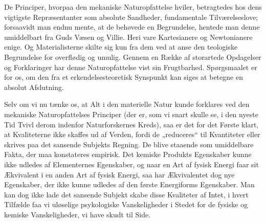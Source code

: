 \documentclass[12pt,a4paper,openany]{book}
\newcommand{\opage}[1]{\marginnote{\footnotesize\textit{[#1]}}}
\begin{document}
De Principer, hvorpaa den mekaniske Naturopfattelse hviler, betragtedes hos
dens vigtigste Repræsentanter som absolute Sandheder, fundamentale
Tilværelseslove; forsaavidt man endnu mente, at de behøvede en Begrundelse,
hentede man denne umiddelbart fra Guds Væsen og Villie. Heri vare Kartesianere
og Newtonianere enige. Og Materialisterne skilte sig kun fra dem ved at anse
den teologiske Begrundelse for overflødig og umulig. Gennem en Række af
storartede Opdagelser og Forklaringer har denne Naturopfattelse vist sin
Frugtbarhed. Spørgsmaalet er for os, om den fra et erkendelsesteoretisk
Synspunkt kan siges at betegne en absolut Afslutning.

Selv om vi nu tænke os, at Alt i den materielle Natur
\opage{40}kunde forklares ved den mekaniske Naturopfattelses Principer (der er,
som vi snart skulle se, i den nyeste Tid Tvivl derom indenfor Naturforskernes
Kreds), saa er det for det Første klart, at Kvaliteterne ikke skaffes ud af
Verden, fordi de „reduceres“ til Kvantiteter eller skrives paa det sansende
Subjekts Regning. De blive staaende som umiddelbare Fakta, der maa konstateres
empirisk. Det kemiske Produkts Egenskaber kunne ikke udledes af Elementernes
Egenskaber, og naar en Art af fysisk Energi faar sit Ækvivalent i en anden Art
af fysisk Energi, saa har Ækvivalentet dog nye Egenskaber, der ikke kunne
udledes af den første Energiforms Egenskaber. Man kan dog ikke lade det
sansende Subjekt skabe disse Kvaliteter af Intet, i hvert Tilfælde faa vi
uløselige psykologiske Vanskeligheder i Stedet for de fysiske og kemiske
Vanskeligheder, vi have skudt til Side.
\end{document}
